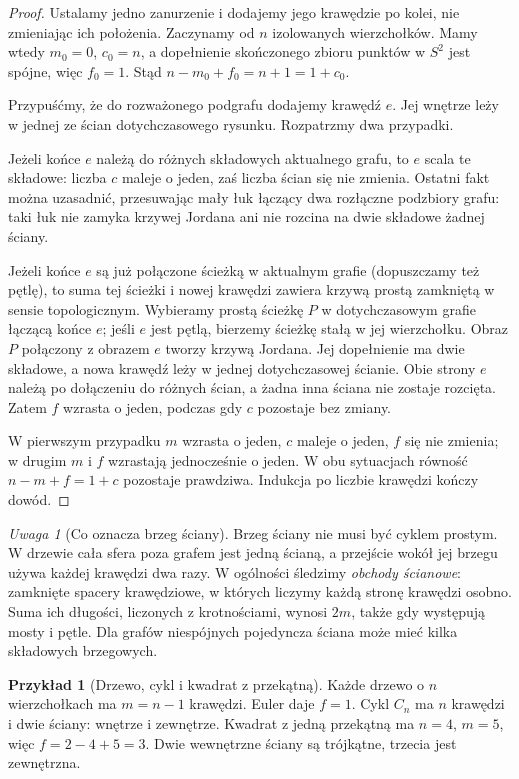 \documentclass[11pt,a4paper]{report}
\numberwithin{equation}{section}
\theoremstyle{plain}
\theoremstyle{definition}
\newtheorem{przyklad}[twierdzenie]{Przykład}
\theoremstyle{remark}
\newtheorem{uwaga}[twierdzenie]{Uwaga}
\begin{document}
\begin{proof}
Ustalamy jedno zanurzenie i dodajemy jego krawędzie po kolei,
nie zmieniając ich położenia. Zaczynamy od $n$ izolowanych
wierzchołków. Mamy wtedy $m_0=0$, $c_0=n$, a dopełnienie
skończonego zbioru punktów w $S^2$ jest spójne, więc $f_0=1$.
Stąd $n-m_0+f_0=n+1=1+c_0$.

Przypuśćmy, że do rozważonego podgrafu dodajemy krawędź $e$.
Jej wnętrze leży w jednej ze ścian dotychczasowego rysunku.
Rozpatrzmy dwa przypadki.

Jeżeli końce $e$ należą do różnych składowych aktualnego grafu,
to $e$ scala te składowe: liczba $c$ maleje o jeden,
zaś liczba ścian się nie zmienia. Ostatni fakt można
uzasadnić, przesuwając mały łuk łączący dwa rozłączne
podzbiory grafu: taki łuk nie zamyka krzywej Jordana
ani nie rozcina na dwie składowe żadnej ściany.

Jeżeli końce $e$ są już połączone ścieżką w aktualnym
grafie (dopuszczamy też pętlę), to suma tej ścieżki
i nowej krawędzi zawiera krzywą prostą zamkniętą
w sensie topologicznym. Wybieramy prostą ścieżkę $P$ w dotychczasowym grafie
łączącą końce $e$; jeśli $e$ jest pętlą, bierzemy ścieżkę
stałą w jej wierzchołku. Obraz $P$ połączony z obrazem
$e$ tworzy krzywą Jordana. Jej dopełnienie ma dwie składowe,
a nowa krawędź leży w jednej dotychczasowej ścianie.
Obie strony $e$ należą po dołączeniu do różnych ścian,
a żadna inna ściana nie zostaje rozcięta. Zatem $f$ wzrasta
o jeden, podczas gdy $c$ pozostaje bez zmiany.

W pierwszym przypadku $m$ wzrasta o jeden, $c$ maleje
o jeden, $f$ się nie zmienia; w drugim $m$ i $f$
wzrastają jednocześnie o jeden. W obu sytuacjach
równość $n-m+f=1+c$ pozostaje prawdziwa. Indukcja
po liczbie krawędzi kończy dowód.
\end{proof}

\begin{uwaga}[Co oznacza brzeg ściany]
Brzeg ściany nie musi być cyklem prostym. W drzewie
cała sfera poza grafem jest jedną ścianą, a przejście
wokół jej brzegu używa każdej krawędzi dwa razy.
W ogólności śledzimy \emph{obchody ścianowe}: zamknięte
spacery krawędziowe, w których liczymy każdą stronę
krawędzi osobno. Suma ich długości, liczonych z krotnościami,
wynosi $2m$, także gdy występują mosty i pętle.
Dla grafów niespójnych pojedyncza ściana może mieć kilka
składowych brzegowych.
\end{uwaga}

\begin{przyklad}[Drzewo, cykl i kwadrat z przekątną]
Każde drzewo o $n$ wierzchołkach ma $m=n-1$ krawędzi.
Euler daje $f=1$. Cykl $C_n$ ma $n$ krawędzi i dwie ściany:
wnętrze i zewnętrze. Kwadrat z jedną przekątną ma
$n=4$, $m=5$, więc $f=2-4+5=3$.
Dwie wewnętrzne ściany są trójkątne, trzecia jest zewnętrzna.
\end{przyklad}
\end{document}
